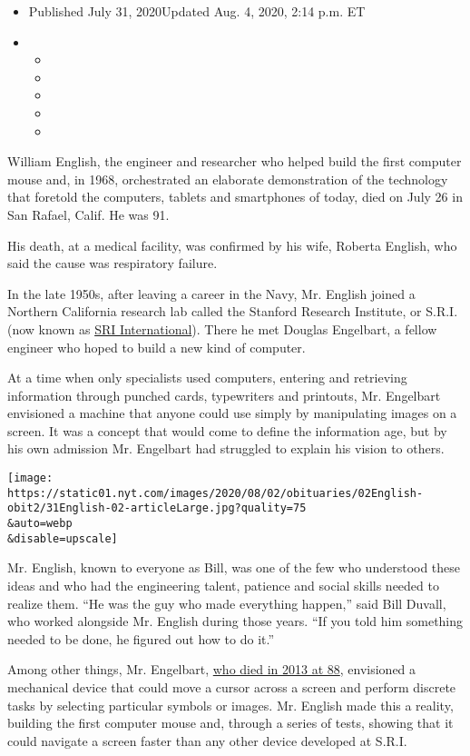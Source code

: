 \begin{itemize}
\item
  Published July 31, 2020Updated Aug. 4, 2020, 2:14 p.m. ET
\item
  \begin{itemize}
  \item
  \item
  \item
  \item
  \item
  \end{itemize}
\end{itemize}

William English, the engineer and researcher who helped build the first
computer mouse and, in 1968, orchestrated an elaborate demonstration of
the technology that foretold the computers, tablets and smartphones of
today, died on July 26 in San Rafael, Calif. He was 91.

His death, at a medical facility, was confirmed by his wife, Roberta
English, who said the cause was respiratory failure.

In the late 1950s, after leaving a career in the Navy, Mr. English
joined a Northern California research lab called the Stanford Research
Institute, or S.R.I. (now known as \href{https://www.sri.com/}{SRI
International}). There he met Douglas Engelbart, a fellow engineer who
hoped to build a new kind of computer.

At a time when only specialists used computers, entering and retrieving
information through punched cards, typewriters and printouts, Mr.
Engelbart envisioned a machine that anyone could use simply by
manipulating images on a screen. It was a concept that would come to
define the information age, but by his own admission Mr. Engelbart had
struggled to explain his vision to others.

\texttt{[image: https://static01.nyt.com/images/2020/08/02/obituaries/02English-obit2/31English-02-articleLarge.jpg?quality=75\\\&auto=webp\\\&disable=upscale]}

Mr. English, known to everyone as Bill, was one of the few who
understood these ideas and who had the engineering talent, patience and
social skills needed to realize them. ``He was the guy who made
everything happen,'' said Bill Duvall, who worked alongside Mr. English
during those years. ``If you told him something needed to be done, he
figured out how to do it.''

Among other things, Mr. Engelbart,
\href{https://www.nytimes.com/2013/07/04/technology/douglas-c-engelbart-inventor-of-the-computer-mouse-dies-at-88.html\#:~:text=Engelbart\%20died\%20on\%20Tuesday\%20at,the\%20cause\%20was\%20kidney\%20failure.}{who
died in 2013 at 88}, envisioned a mechanical device that could move a
cursor across a screen and perform discrete tasks by selecting
particular symbols or images. Mr. English made this a reality, building
the first computer mouse and, through a series of tests, showing that it
could navigate a screen faster than any other device developed at S.R.I.

